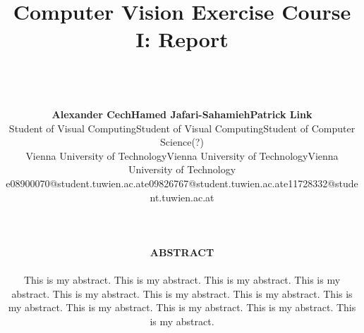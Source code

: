 \documentclass[a4paper,psfig,subfigure,epsfig,fleqn,ausarbeitung,amssmb,float,caption,fontenc]{article}
\begin{document}
\date{}

\title{%
  \fontsize{14}{14pt} \bf Computer Vision Exercise Course I: Report}

\author{~\\
  ~\\
  \fontsize{12}{12pt}
  \begin{tabular}[t]{c c c}
  {\bf Alexander Cech}                    & {\bf Hamed Jafari-Sahamieh}             & {\bf Patrick Link}                      \\
  \small{Student of Visual Computing}     & \small{Student of Visual Computing}     & \small{Student of Computer Science(?)}  \\
  \small{Vienna University of Technology} & \small{Vienna University of Technology} & \small{Vienna University of Technology} \\
  \small{e08900070@student.tuwien.ac.at}  & \small{e09826767@student.tuwien.ac.at}                               & \small{e11728332@student.tuwien.ac.at}  \\
  \end{tabular}
  ~\\ ~\\ ~\\
  \normalsize
  {\bf ABSTRACT} \\ 
  \noindent
  \hspace{0.2cm}
  \begin{minipage}[c]{15cm}
  \normalsize This is my abstract.  This is my abstract.  This is my
    abstract.  This is my abstract.  This is my abstract.  This is my
    abstract.  This is my abstract.  This is my abstract.  This is my
    abstract.  This is my abstract.  This is my abstract.  This is my
    abstract.\\
  \end{minipage}
  \normalsize
  }

\maketitle

\normalfont
\thispagestyle{empty}
\end{document}
